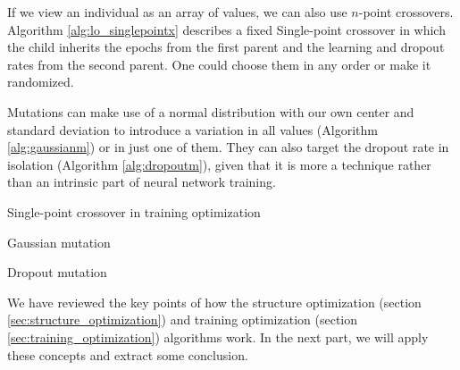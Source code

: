 	\vspace{0.3cm}

	If we view an individual as an array of values, we can also use $n$-point crossovers. Algorithm \ref{alg:lo_singlepointx} describes a fixed Single-point crossover in which the child inherits the epochs from the first parent and the learning and dropout rates from the second parent. One could choose them in any order or make it randomized.

	Mutations can make use of a normal distribution with our own center and standard deviation to introduce a variation in all values (Algorithm \ref{alg:gaussianm}) or in just one of them. They can also target the dropout rate in isolation (Algorithm \ref{alg:dropoutm}), given that it is more a technique rather than an intrinsic part of neural network training.

	\vspace{0.3cm}

	\begin{algorithm}[H]\label{alg:lo_singlepointx}


		\caption{Single-point crossover in training optimization}

	\end{algorithm}

	\vspace{0.3cm}

	\begin{algorithm}[H]\label{alg:gaussianm}


		\caption{Gaussian mutation}

	\end{algorithm}

	\vspace{0.3cm}

	\begin{algorithm}[H]\label{alg:dropoutm}


		\caption{Dropout mutation}

	\end{algorithm}

	\vspace{0.3cm}

	We have reviewed the key points of how the structure optimization (section \ref{sec:structure_optimization}) and training optimization (section \ref{sec:training_optimization}) algorithms work. In the next part, we will apply these concepts and extract some conclusion.